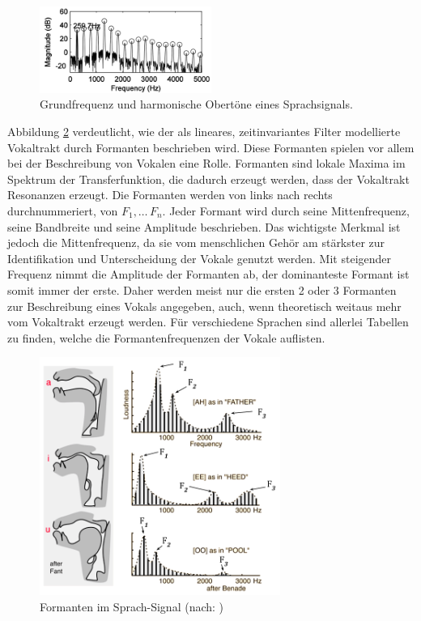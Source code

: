 \begin{figure}[h]
	\centering
	\includegraphics[width=0.5\textwidth]{bilder/pitchPeaks.png}
	\caption{Grundfrequenz und harmonische Obertöne eines Sprachsignals.}
	\label{img:pitchPeaks}
\end{figure}	

Abbildung \ref{img:formants} verdeutlicht, wie der als lineares, zeitinvariantes Filter modellierte Vokaltrakt durch Formanten beschrieben wird. Diese Formanten spielen vor allem bei der Beschreibung von Vokalen eine Rolle. Formanten sind lokale Maxima im Spektrum der Transferfunktion, die dadurch erzeugt werden, dass der Vokaltrakt Resonanzen erzeugt. Die Formanten werden von links nach rechts durchnummeriert, von $F_1 ,\ldots\,F_n$. Jeder Formant wird durch seine Mittenfrequenz, seine Bandbreite und seine Amplitude beschrieben. Das wichtigste Merkmal ist jedoch die Mittenfrequenz, da sie vom menschlichen Gehör am stärkster zur Identifikation und Unterscheidung der Vokale genutzt werden. Mit steigender Frequenz nimmt die Amplitude der Formanten ab, der dominanteste Formant ist somit immer der erste. Daher werden meist nur die ersten 2 oder 3 Formanten zur Beschreibung eines Vokals angegeben, auch, wenn theoretisch weitaus mehr vom Vokaltrakt erzeugt werden. Für verschiedene Sprachen sind allerlei Tabellen zu finden, welche die Formantenfrequenzen der Vokale auflisten.\cite[S. 19]{sprachverarbeitung}

\begin{figure}[h]
	\centering
	\includegraphics[width=0.7\textwidth]{bilder/formants02.png}
	\caption{Formanten im Sprach-Signal (nach: \cite{benade})}
	\label{img:formants}
\end{figure}	

